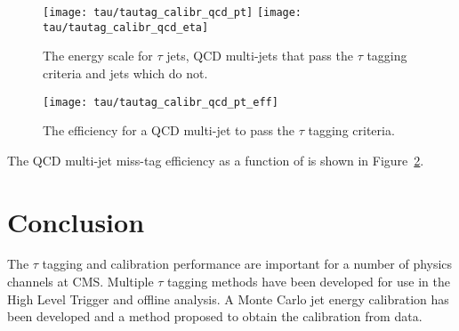 \begin{figure}[tb]
  \centering
  \texttt{[image: tau/tautag\_calibr\_qcd\_pt]}
  \texttt{[image: tau/tautag\_calibr\_qcd\_eta]}
  \caption{The energy scale for $\tau$ jets, QCD multi-jets that pass the $\tau$ tagging criteria and jets which do not.~\cite{CMS_TDR_PHYS_vol1, citeulike:800614}
  \label{fig:tau_qcd_scale}}
\end{figure}

\begin{figure}[tb]
  \centering
  \texttt{[image: tau/tautag\_calibr\_qcd\_pt\_eff]}
  \caption{The efficiency for a QCD multi-jet to pass the $\tau$ tagging criteria.~\cite{CMS_TDR_PHYS_vol1, citeulike:800614}
  \label{fig:tau_qcd_eff}}
\end{figure}
The QCD multi-jet miss-tag efficiency as a function of \ET is shown in Figure~\ref{fig:tau_qcd_eff}.

\section{Conclusion}
The $\tau$ tagging and calibration performance are important for a number of physics channels at CMS. Multiple $\tau$ tagging methods have been developed for use in the High Level Trigger and offline analysis. A Monte Carlo jet energy calibration has been developed and a method proposed to obtain the calibration from data.
